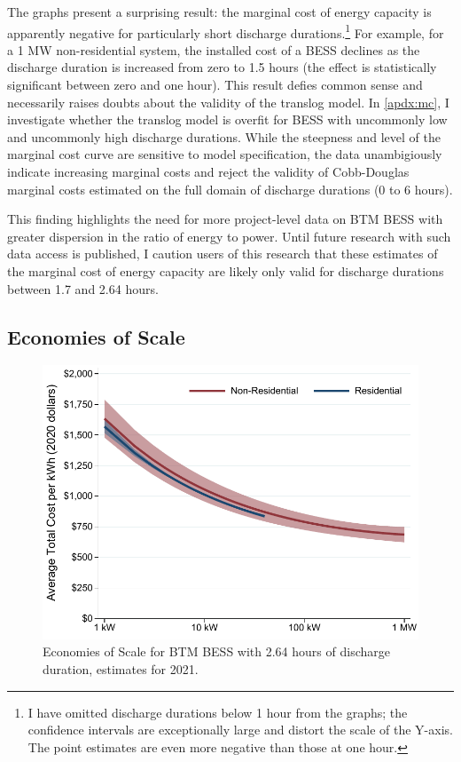 \documentclass[preprint,12pt,authoryear]{elsarticle}
\begin{document}
The graphs present a surprising result: the marginal cost of energy capacity is apparently negative for particularly short discharge durations.\footnote{I have omitted discharge durations below 1 hour from the graphs; the confidence intervals are exceptionally large and distort the scale of the Y-axis. The point estimates are even more negative than those at one hour.}  For example, for a 1 MW non-residential system, the installed cost of a BESS declines as the discharge duration is increased from zero to 1.5 hours (the effect is statistically significant between zero and one hour). This result defies common sense and necessarily raises doubts about the validity of the translog model. In \ref{apdx:mc}, I investigate whether the translog model is overfit for BESS with uncommonly low and uncommonly high discharge durations. While the steepness and level of the marginal cost curve are sensitive to model specification, the data unambigiously indicate increasing marginal costs and reject the validity of Cobb-Douglas marginal costs estimated on the full domain of discharge durations (0 to 6 hours).

This finding highlights the need for more project-level data on BTM BESS with greater dispersion in the ratio of energy to power. Until future research with such data access is published, I caution users of this research that these estimates of the marginal cost of energy capacity are likely only valid for discharge durations between 1.7 and 2.64 hours.

\subsection{Economies of Scale}\label{sec:scale}

\begin{figure}[t]
\centering
\includegraphics[width=\textwidth]{graphs/CA_SGIP/EOS.pdf}
\caption{Economies of Scale for BTM BESS with 2.64 hours of discharge duration, estimates for 2021.}\label{fig:EOS}
\end{figure}
\end{document}
